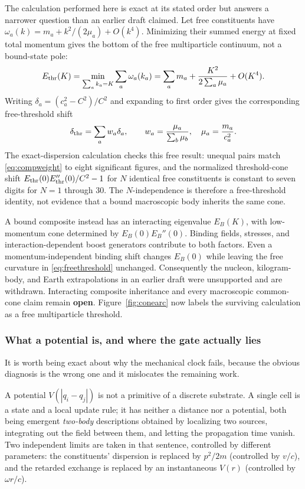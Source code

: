 \documentclass[11pt,a4paper]{article}
\theoremstyle{definition}
\theoremstyle{plain}
\theoremstyle{remark}
\begin{document}
The calculation performed here is exact at its stated order but answers a
narrower question than an earlier draft claimed. Let free constituents
have
$\omega_a(k)=m_a+k^2/(2\mu_a)+O(k^4)$. Minimizing their summed energy at
fixed total momentum gives the bottom of the free multiparticle continuum,
not a bound-state pole:
\begin{equation}
E_{\rm thr}(K)=\min_{\sum_a k_a=K}\sum_a\omega_a(k_a)
=\sum_a m_a+\frac{K^2}{2\sum_a\mu_a}+O(K^4).
\label{eq:freethreshold}
\end{equation}
Writing $\delta_a=(c_a^2-C^2)/C^2$ and expanding to first order gives the
corresponding free-threshold shift
\begin{equation}
\delta_{\rm thr} = \sum_a w_a \delta_a, \qquad
w_a = \frac{\mu_a}{\sum_b \mu_b}, \quad \mu_a = \frac{m_a}{c_a^2}.
\label{eq:compweight}
\end{equation}
The exact-dispersion calculation checks this free result: unequal pairs
match \eqref{eq:compweight} to eight significant figures, and the normalized
threshold-cone shift $E_{\rm thr}(0)E_{\rm thr}''(0)/C^2-1$ for $N$
identical free constituents is constant to seven digits for $N=1$ through
$30$. The $N$-independence is therefore a free-threshold
identity, not evidence that a bound macroscopic body inherits the same
cone.

A bound composite instead has an interacting eigenvalue $E_B(K)$, with
low-momentum cone determined by $E_B(0)E_B''(0)$. Binding fields, stresses,
and interaction-dependent boost generators contribute to both factors.
Even a momentum-independent binding shift changes $E_B(0)$ while leaving
the free curvature in \eqref{eq:freethreshold} unchanged. Consequently the
nucleon, kilogram-body, and Earth extrapolations in an earlier draft were
unsupported and are withdrawn. Interacting composite inheritance and every
macroscopic common-cone claim remain \textbf{open}. Figure~\ref{fig:conearc}
now labels the surviving calculation as a free multiparticle threshold.

\subsubsection{What a potential is, and where the gate actually lies}
\label{sec:potential}

It is worth being exact about why the mechanical clock fails, because the
obvious diagnosis is the wrong one and it mislocates the remaining work.

A potential $V(|q_i-q_j|)$ is not a primitive of a discrete substrate. A
single cell is a state and a local update rule; it has neither a distance
nor a potential, both being emergent \emph{two-body} descriptions obtained
by localizing two sources, integrating out the field between them, and
letting the propagation time vanish. Two independent limits are taken in
that sentence, controlled by different parameters: the constituents'
dispersion is replaced by $p^2/2m$ (controlled by $v/c$), and the retarded
exchange is replaced by an instantaneous $V(r)$ (controlled by
$\omega r/c$).
\end{document}
